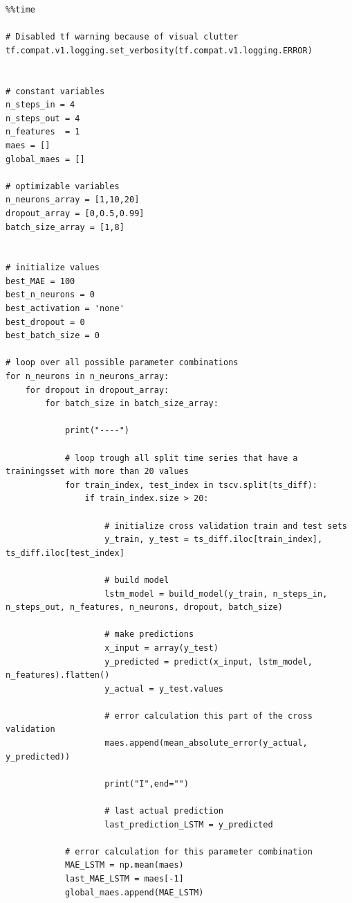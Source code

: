 \begin{verbatim}
%%time

# Disabled tf warning because of visual clutter
tf.compat.v1.logging.set_verbosity(tf.compat.v1.logging.ERROR)


# constant variables
n_steps_in = 4
n_steps_out = 4
n_features  = 1
maes = []
global_maes = []

# optimizable variables
n_neurons_array = [1,10,20]
dropout_array = [0,0.5,0.99]
batch_size_array = [1,8]


# initialize values
best_MAE = 100
best_n_neurons = 0
best_activation = 'none'
best_dropout = 0
best_batch_size = 0

# loop over all possible parameter combinations
for n_neurons in n_neurons_array:
    for dropout in dropout_array:
        for batch_size in batch_size_array:
        
            print("----")
            
            # loop trough all split time series that have a trainingsset with more than 20 values
            for train_index, test_index in tscv.split(ts_diff): 
                if train_index.size > 20:  
                
                    # initialize cross validation train and test sets
                    y_train, y_test = ts_diff.iloc[train_index], ts_diff.iloc[test_index]
                    
                    # build model
                    lstm_model = build_model(y_train, n_steps_in, n_steps_out, n_features, n_neurons, dropout, batch_size)
                    
                    # make predictions
                    x_input = array(y_test)
                    y_predicted = predict(x_input, lstm_model, n_features).flatten()
                    y_actual = y_test.values
                    
                    # error calculation this part of the cross validation
                    maes.append(mean_absolute_error(y_actual, y_predicted))
                    
                    print("I",end="")
                    
                    # last actual prediction 
                    last_prediction_LSTM = y_predicted
                    
            # error calculation for this parameter combination
            MAE_LSTM = np.mean(maes)
            last_MAE_LSTM = maes[-1]
            global_maes.append(MAE_LSTM)
            

\end{verbatim}
